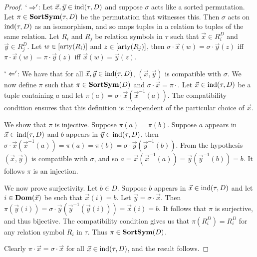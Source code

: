 \documentclass[../paper.tex]{subfiles}
\begin{document}
\begin{proof}
  $`\Rightarrow'$: Let $\vec{x}, \vec{y} \in \text{\upshape ind}(\tau, D)$ and
  suppose $\sigma$ acts like a sorted permutation.  Let $\pi \in
  \text{\textbf{SortSym}}(\tau, D)$ be the permutation that witnesses this.  Then $\sigma$
  acts on $\text{\upshape ind} (\tau, D)$ as an isomorphism, and so maps tuples in a
  relation to tuples of the same relation. Let $R_i$ and $R_j$ be relation
  symbols in $\tau$ such that $\vec{x} \in
  R^D_i$ and $\vec{y} \in R^D_j$. Let $w \in [\mathrm{arty}
  (R_i)]$ and $z \in [\mathrm{arty} (R_j)]$, then $\sigma \cdot \vec{x} (w) = \sigma
  \cdot \vec{y}(z)$ iff $\pi \cdot \vec{x}(w) = \pi \cdot \vec{y}(z)$ iff
  $\vec{x}(w) = \vec{y}(z)$.


  
  $`\Leftarrow'$: We have that for all $\vec{x}, \vec{y} \in \text{\upshape ind}(\tau, D)$,
  $(\vec{x}, \vec{y})$ is compatible with $\sigma$. We now define $\pi$ such
  that $\pi \in \text{\textbf{SortSym}}(D)$ and $\sigma \cdot \vec{x} = \pi \cdot$. Let $\vec{x} \in \text{\upshape ind}(\tau, D)$ be a tuple containing $a$ and
  let $\pi (a) = \sigma \cdot \vec{x} (\vec{x}^{-1}(a))$. The compatibility
  condition ensures that this definition is independent of the particular
  choice of $\vec{x}$.
  
  We show that $\pi$ is injective. Suppose $\pi(a) = \pi(b)$. Suppose $a$ appears in $\vec{x} \in
  \text{\upshape ind}(\tau, D)$ and $b$ appears in $\vec{y} \in \text{\upshape ind}(\tau, D)$, then
  $\sigma \cdot \vec{x} (\vec{x}^{-1}(a)) = \pi (a) = \pi(b) = \sigma \cdot
  \vec{y}(\vec{y}^{-1}(b))$. From the hypothesis $(\vec{x}, \vec{y})$ is
  compatible with $\sigma$, and so $a = \vec{x}(\vec{x}^{-1}(a)) =
  \vec{y}(\vec{y}^{-1}(b)) = b$. It follows
  $\pi$ is an injection.

  
  We now prove surjectivity. Let $b \in D$. Suppose $b$ appears in
  $\vec{x} \in \text{\upshape ind}(\tau, D)$ and let $i \in \text{\textbf{Dom}}(\vec{x})$ be such that
  $\vec{x}(i) = b$. Let $\vec{y} = \sigma \cdot \vec{x}$. Then $\pi (\vec{y}(i))
  = \sigma \cdot \vec{y} (\vec{y}^{-1}(\vec{y}(i))) = \vec{x}(i) = b$. It
  follows that $\pi$ is surjective, and thus bijective. The compatibility
  condition gives us that $\pi (R^D_i) = R^D_i$ for any
  relation symbol $R_i$ in $\tau$. Thus $\pi \in \text{\textbf{SortSym}}(D)$.

  Clearly $\pi \cdot \vec{x} = \sigma \cdot \vec{x}$ for all $\vec{x} \in
  \text{\upshape ind}(\tau, D)$, and the result follows.
\end{proof}
\end{document}

